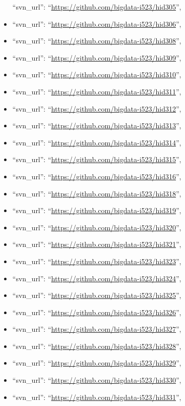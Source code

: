 \begin{itemize}
  ``svn\_url'': ``\url{https://github.com/bigdata-i523/hid305}'',
\item
  ``svn\_url'': ``\url{https://github.com/bigdata-i523/hid306}'',
\item
  ``svn\_url'': ``\url{https://github.com/bigdata-i523/hid308}'',
\item
  ``svn\_url'': ``\url{https://github.com/bigdata-i523/hid309}'',
\item
  ``svn\_url'': ``\url{https://github.com/bigdata-i523/hid310}'',
\item
  ``svn\_url'': ``\url{https://github.com/bigdata-i523/hid311}'',
\item
  ``svn\_url'': ``\url{https://github.com/bigdata-i523/hid312}'',
\item
  ``svn\_url'': ``\url{https://github.com/bigdata-i523/hid313}'',
\item
  ``svn\_url'': ``\url{https://github.com/bigdata-i523/hid314}'',
\item
  ``svn\_url'': ``\url{https://github.com/bigdata-i523/hid315}'',
\item
  ``svn\_url'': ``\url{https://github.com/bigdata-i523/hid316}'',
\item
  ``svn\_url'': ``\url{https://github.com/bigdata-i523/hid318}'',
\item
  ``svn\_url'': ``\url{https://github.com/bigdata-i523/hid319}'',
\item
  ``svn\_url'': ``\url{https://github.com/bigdata-i523/hid320}'',
\item
  ``svn\_url'': ``\url{https://github.com/bigdata-i523/hid321}'',
\item
  ``svn\_url'': ``\url{https://github.com/bigdata-i523/hid323}'',
\item
  ``svn\_url'': ``\url{https://github.com/bigdata-i523/hid324}'',
\item
  ``svn\_url'': ``\url{https://github.com/bigdata-i523/hid325}'',
\item
  ``svn\_url'': ``\url{https://github.com/bigdata-i523/hid326}'',
\item
  ``svn\_url'': ``\url{https://github.com/bigdata-i523/hid327}'',
\item
  ``svn\_url'': ``\url{https://github.com/bigdata-i523/hid328}'',
\item
  ``svn\_url'': ``\url{https://github.com/bigdata-i523/hid329}'',
\item
  ``svn\_url'': ``\url{https://github.com/bigdata-i523/hid330}'',
\item
  ``svn\_url'': ``\url{https://github.com/bigdata-i523/hid331}'',

\end{itemize}
